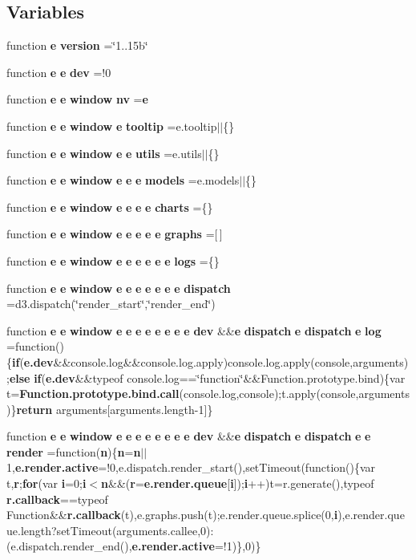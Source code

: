 \subsection*{Variables}
\begin{DoxyCompactItemize}
\item 
function {\bf e} {\bf version} =\char`\"{}1..\+15b\char`\"{}
\item 
function {\bf e} {\bf e} {\bf dev} =!0
\item 
function {\bf e} {\bf e} {\bf window} {\bf nv} ={\bf e}
\item 
function {\bf e} {\bf e} {\bf window} {\bf e} {\bf tooltip} =e.\+tooltip$\vert$$\vert$\{\}
\item 
function {\bf e} {\bf e} {\bf window} {\bf e} {\bf e} {\bf utils} =e.\+utils$\vert$$\vert$\{\}
\item 
function {\bf e} {\bf e} {\bf window} {\bf e} {\bf e} {\bf e} {\bf models} =e.\+models$\vert$$\vert$\{\}
\item 
function {\bf e} {\bf e} {\bf window} {\bf e} {\bf e} {\bf e} {\bf e} {\bf charts} =\{\}
\item 
function {\bf e} {\bf e} {\bf window} {\bf e} {\bf e} {\bf e} {\bf e} {\bf e} {\bf graphs} =[$\,$]
\item 
function {\bf e} {\bf e} {\bf window} {\bf e} {\bf e} {\bf e} {\bf e} {\bf e} {\bf e} {\bf logs} =\{\}
\item 
function {\bf e} {\bf e} {\bf window} {\bf e} {\bf e} {\bf e} {\bf e} {\bf e} {\bf e} {\bf e} {\bf dispatch} =d3.\+dispatch(\char`\"{}render\+\_\+start\char`\"{},\char`\"{}render\+\_\+end\char`\"{})
\item 
function {\bf e} {\bf e} {\bf window} {\bf e} {\bf e} {\bf e} {\bf e} {\bf e} {\bf e} {\bf e} {\bf e} {\bf dev} \&\&{\bf e} {\bf dispatch} {\bf e} {\bf dispatch} {\bf e} {\bf log} =function()\{{\bf if}({\bf e.\+dev}\&\&console.\+log\&\&console.\+log.\+apply)console.\+log.\+apply(console,arguments);{\bf else} {\bf if}({\bf e.\+dev}\&\&typeof console.\+log==\char`\"{}function\char`\"{}\&\&Function.\+prototype.\+bind)\{var t={\bf Function.\+prototype.\+bind.\+call}(console.\+log,console);t.\+apply(console,arguments)\}{\bf return} arguments[arguments.\+length-\/1]\}
\item 
function {\bf e} {\bf e} {\bf window} {\bf e} {\bf e} {\bf e} {\bf e} {\bf e} {\bf e} {\bf e} {\bf e} {\bf dev} \&\&{\bf e} {\bf dispatch} {\bf e} {\bf dispatch} {\bf e} {\bf e} {\bf render} =function({\bf n})\{{\bf n}={\bf n}$\vert$$\vert$1,{\bf e.\+render.\+active}=!0,e.\+dispatch.\+render\+\_\+start(),set\+Timeout(function()\{var t,{\bf r};{\bf for}(var {\bf i}=0;{\bf i}$<${\bf n}\&\&({\bf r}={\bf e.\+render.\+queue}[{\bf i}]);{\bf i}++)t=r.\+generate(),typeof {\bf r.\+callback}==typeof Function\&\&{\bf r.\+callback}(t),e.\+graphs.\+push(t);e.\+render.\+queue.\+splice(0,{\bf i}),e.\+render.\+queue.\+length?set\+Timeout(arguments.\+callee,0)\+:(e.\+dispatch.\+render\+\_\+end(),{\bf e.\+render.\+active}=!1)\},0)\}

\end{DoxyCompactItemize}
